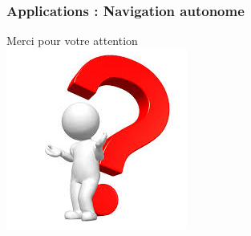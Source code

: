 \begin{frame}
	\frametitle{Applications : Navigation autonome}
	\centering
\end{frame}

%

\begin{frame}
	\huge Merci pour votre attention\\
	\vspace{0.5cm}
	\centering\includegraphics[scale=0.5]{Files/fig/Questions.jpeg}
\end{frame}
